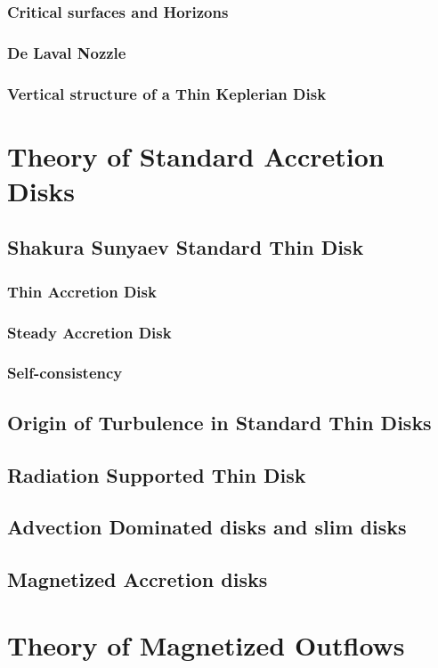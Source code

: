 \documentclass[10pt,a4paper,english]{article}
\begin{document}
\subsubsection{Critical surfaces and Horizons}
\subsubsection{De Laval Nozzle}
\subsubsection{Vertical structure of a Thin Keplerian Disk}

\section{Theory of Standard Accretion Disks}
\subsection{Shakura Sunyaev Standard Thin Disk}
\subsubsection{Thin Accretion Disk}
\subsubsection{Steady Accretion Disk}
\subsubsection{Self-consistency}
\subsection{Origin of Turbulence in Standard Thin Disks}
\subsection{Radiation Supported Thin Disk}
\subsection{Advection Dominated disks and slim disks}
\subsection{Magnetized Accretion disks}

\section{Theory of Magnetized Outflows}
\end{document}
